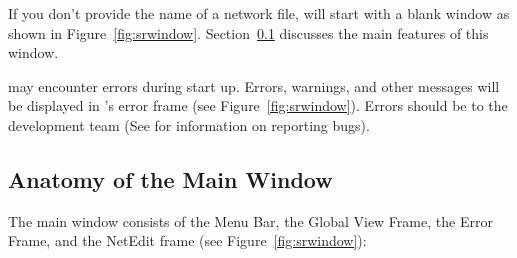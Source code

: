 If you don't provide the name of a network file, \sr{} will start with
a blank window as shown in Figure~\ref{fig:srwindow}.
Section~\ref{sec:windowanatomy} discusses the main features of this
window.

\sr{} may encounter errors during start up.  Errors, warnings, and
other messages will be displayed in
\sr{}'s error frame (see Figure~\ref{fig:srwindow}).   Errors
should be  to the \sr{} development
team (See  for information on
reporting bugs).

\subsection{Anatomy of the Main Window}
\label{sec:windowanatomy}

The \sr{} main window consists of the Menu Bar, the Global View Frame,
the Error Frame, and the NetEdit frame (see
Figure~\ref{fig:srwindow}):

